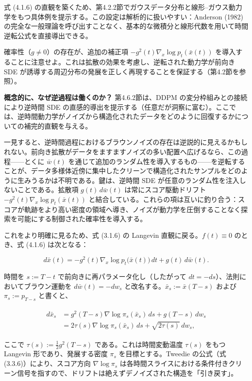 式 (4.1.6) の直観を築くため、第4.2.2節でガウスデータ分布と線形–ガウス動力学をもつ具体例を提示する。この設定は解析的に扱いやすい：Anderson (1982) の完全な一般理論を呼び出すことなく、基本的な微積分と線形代数を用いて時間逆転公式を直接導出できる。

確率性（$g\neq 0$）の存在が、追加の補正項 $-g^2(t)\nabla_x\log p_t(\bar{x}(t))$ を導入することに注意せよ。これは拡散の効果を考慮し、逆転された動力学が前向き SDE が誘導する周辺分布の発展を正しく再現することを保証する（第4.2節を参照）。

\textbf{概念的に、なぜ逆過程は働くのか？} 第4.6.2節は、DDPM の変分枠組みとの接続により逆時間 SDE の直感的導出を提示する（任意だが洞察に富む）。ここでは、逆時間動力学がノイズから構造化されたデータをどのように回復するかについての補完的直観を与える。

一見すると、逆時間過程におけるブラウンノイズの存在は逆説的に見えるかもしれない。前向き拡散がデータをますますノイズの多い配置へ広げるなら、この過程——とくに $\bar{w}(t)$ を通じて追加のランダム性を導入するもの——を逆転することが、データ多様体近傍に集中したクリーンで構造化されたサンプルをどのように生みうるかは不明である。鍵は、逆時間 SDE が任意のランダム性を注入しないことである。拡散項 $g(t)\,d\bar{w}(t)$ は常にスコア駆動ドリフト $-g^2(t)\nabla_x\log p_t(\bar{x}(t))$ と結合している。これらの項は互いに釣り合う：スコアが軌跡をより高い密度の領域へ導き、ノイズが動力学を圧倒することなく探索を可能にする制御された確率性を導入する。

これをより明確に見るため、式 (3.1.6) の Langevin 直観に戻る。$f(t)\equiv 0$ のとき、式 (4.1.6) は次となる：

\[
d\bar{x}(t) = -g^2(t)\nabla_x\log p_t\bigl(\bar{x}(t)\bigr)\, dt + g(t)\, d\bar{w}(t).
\]


時間を $s:=T-t$ で前向きに再パラメータ化し（したがって $dt=-ds$）、法則においてブラウン運動を $d\bar{w}(t)=-dw_s$ と改名する。$\bar{x}_s:=\bar{x}(T-s)$ および $\pi_s:=p_{T-s}$ と書くと、

\begin{align*}
\begin{aligned}
d\bar{x}_s
&= g^2(T-s)\nabla\log\pi_s(\bar{x}_s)\, ds + g(T-s)\, dw_s \\
&= 2\tau(s)\nabla\log\pi_s(\bar{x}_s)\, ds + \sqrt{2\tau(s)}\, dw_s,
\end{aligned}
\end{align*}


ここで $\tau(s):=\tfrac12 g^2(T-s)$ である。これは時間変動温度 $\tau(s)$ をもつ Langevin 形であり、発展する密度 $\pi_s$ を目標とする。Tweedie の公式（式 (3.3.6)）により、スコア方向 $\nabla\log\pi_s$ は各時間スライスにおける条件付きクリーン信号を指すので、ドリフトは絶えずデノイズされた構造を「引き戻す」。

